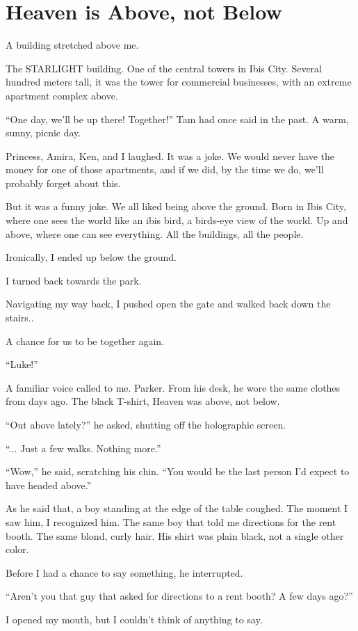 \section{Heaven is Above, not Below}
A building stretched above me.

The STARLIGHT building. One of the central towers in Ibis City. Several hundred meters tall, it was the tower for commercial businesses, with an extreme apartment complex above.

“One day, we’ll be up there! Together!” Tam had once said in the past. A warm, sunny, picnic day.

Princess, Amira, Ken, and I laughed. It was a joke. We would never have the money for one of those apartments, and if we did, by the time we do, we’ll probably forget about this.

But it was a funny joke. We all liked being above the ground. Born in Ibis City, where one sees the world like an ibis bird, a birds-eye view of the world. Up and above, where one can see everything. All the buildings, all the people.

Ironically, I ended up below the ground.

I turned back towards the park.

Navigating my way back, I pushed open the gate and walked back down the stairs..

A chance for us to be together again.

“Luke!”

A familiar voice called to me. Parker. From his desk, he wore the same clothes from days ago. The black T-shirt, Heaven was above, not below.

“Out above lately?” he asked, shutting off the holographic screen.

“... Just a few walks. Nothing more.”

“Wow,” he said, scratching his chin. “You would be the last person I’d expect to have headed above.”

As he said that, a boy standing at the edge of the table coughed. The moment I saw him, I recognized him. The same boy that told me directions for the rent booth. The same blond, curly hair. His shirt was plain black, not a single other color.

Before I had a chance to say something, he interrupted.

“Aren’t you that guy that asked for directions to a rent booth? A few days ago?”

I opened my mouth, but I couldn’t think of anything to say. 

